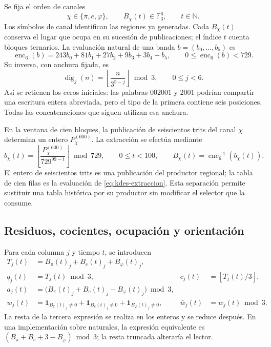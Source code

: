 Se fija el orden de canales
\[
 \chi\in\{\pi,e,\varphi\},
 \qquad B_\chi(t)\in\mathbb F_3^6,
 \qquad t\in\mathbb N.
\]
Los símbolos de canal identifican las regiones ya generadas. Cada
$B_\chi(t)$ conserva el lugar que ocupa en su sucesión de publicaciones;
el índice $t$ cuenta bloques ternarios. La evaluación natural de una
banda $b=(b_0,\ldots,b_5)$ es
\begin{equation}
 \operatorname{enc}_6(b)=
 243b_0+81b_1+27b_2+9b_3+3b_4+b_5,
 \qquad 0\leq\operatorname{enc}_6(b)<729.
 \label{eq:kdes-enc6}
\end{equation}
Su inversa, con anchura fijada, es
\[
 \operatorname{dig}_j(n)=
 \left\lfloor\frac{n}{3^{5-j}}\right\rfloor\bmod3,
 \qquad 0\leq j<6.
\]
Así se retienen los ceros iniciales: las palabras $002001$ y $2001$
podrían compartir una escritura entera abreviada, pero el tipo de la
primera contiene seis posiciones. Todas las concatenaciones que siguen
utilizan esa anchura.

En la ventana de cien bloques, la publicación de seiscientos trits del
canal $\chi$ determina un entero $P_\chi^{(600)}$. La extracción se efectúa
mediante
\begin{equation}
 b_\chi(t)=
 \left\lfloor\frac{P_\chi^{(600)}}{729^{99-t}}\right\rfloor\bmod729,
 \qquad 0\leq t<100,
 \qquad B_\chi(t)=\operatorname{enc}_6^{-1}(b_\chi(t)).
 \label{eq:kdes-extraccion}
\end{equation}
El entero de seiscientos trits es una publicación del productor regional;
la tabla de cien filas es la evaluación de
\eqref{eq:kdes-extraccion}. Esta separación permite sustituir una tabla
histórica por su productor sin modificar el selector que la consume.

\subsection{Residuos, cocientes, ocupación y orientación}

Para cada columna $j$ y tiempo $t$, se introducen
\begin{align}
 T_j(t)&=B_\pi(t)_j+B_e(t)_j+B_\varphi(t)_j,\\
 q_j(t)&=T_j(t)\bmod3,
 &c_j(t)&=\left\lfloor T_j(t)/3\right\rfloor,\\
 a_j(t)&=\bigl(B_\pi(t)_j+B_e(t)_j-B_\varphi(t)_j\bigr)\bmod3,\\
 w_j(t)&=\mathbf1_{B_\pi(t)_j\ne0}
       +\mathbf1_{B_e(t)_j\ne0}
       +\mathbf1_{B_\varphi(t)_j\ne0},
 &\bar w_j(t)&=w_j(t)\bmod3.
 \label{eq:kdes-firmas}
\end{align}
La resta de la tercera expresión se realiza en los enteros y se reduce
después. En una implementación sobre naturales, la expresión equivalente
es $(B_\pi+B_e+3-B_\varphi)\bmod3$; la resta truncada alteraría el lector.

